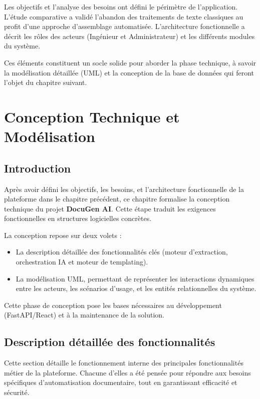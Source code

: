 \documentclass[12pt, a4paper]{report}
\begin{document}
Les objectifs et l'analyse des besoins ont défini le périmètre de l'application. L'étude comparative a validé l'abandon des traitements de texte classiques au profit d'une approche d'assemblage automatisée. L'architecture fonctionnelle a décrit les rôles des acteurs (Ingénieur et Administrateur) et les différents modules du système.

Ces éléments constituent un socle solide pour aborder la phase technique, à savoir la modélisation détaillée (UML) et la conception de la base de données qui feront l'objet du chapitre suivant.

\chapter{Conception Technique et Modélisation}

\section*{Introduction}
Après avoir défini les objectifs, les besoins, et l'architecture fonctionnelle de la plateforme dans le chapitre précédent, ce chapitre formalise la conception technique du projet \textbf{DocuGen AI}. Cette étape traduit les exigences fonctionnelles en structures logicielles concrètes.

La conception repose sur deux volets :
\begin{itemize}
    \item La description détaillée des fonctionnalités clés (moteur d'extraction, orchestration IA et moteur de templating).
    \item La modélisation UML, permettant de représenter les interactions dynamiques entre les acteurs, les scénarios d’usage, et les entités relationnelles du système.
\end{itemize}

Cette phase de conception pose les bases nécessaires au développement (FastAPI/React) et à la maintenance de la solution.

\section{Description détaillée des fonctionnalités}
Cette section détaille le fonctionnement interne des principales fonctionnalités métier de la plateforme. Chacune d'elles a été pensée pour répondre aux besoins spécifiques d'automatisation documentaire, tout en garantissant efficacité et sécurité.
\end{document}
